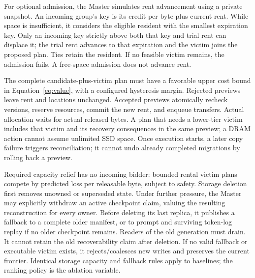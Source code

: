 For optional admission, the Master simulates rent advancement using a
private snapshot. An incoming group's key is its credit per byte plus
current rent. While space is insufficient, it considers the eligible
resident with the smallest expiration key. Only an incoming key strictly
above both that key and trial rent can displace it; the trial rent advances
to that expiration and the victim joins the proposed plan. Ties retain the
resident. If no feasible victim remains, the admission fails. A free-space
admission does not advance rent.

The complete candidate-plus-victim plan must have a favorable upper cost
bound in Equation~\ref{eq:value}, with a configured hysteresis margin.
Rejected previews leave rent and locations unchanged. Accepted previews
atomically recheck versions, reserve resources, commit the new rent, and
enqueue transfers. Actual allocation waits for actual released bytes. A plan that needs a
lower-tier victim includes that victim and its recovery consequences in
the same preview; a DRAM action cannot assume unlimited SSD space.
Once execution starts, a later copy failure triggers reconciliation;
it cannot undo already completed migrations by rolling back a preview.

Required capacity relief has no incoming bidder: bounded rental victim
plans compete by predicted loss per releasable byte, subject to safety.
Storage deletion first removes unowned or superseded state. Under further
pressure, the Master may explicitly withdraw an active checkpoint claim,
valuing the resulting reconstruction for every owner. Before deleting its
last replica, it publishes a fallback to a complete older manifest, or to
prompt and surviving token-log replay if no older checkpoint remains.
Readers of the old generation must drain. It cannot retain the old
recoverability claim after deletion. If no valid fallback or executable
victim exists, it rejects/coalesces new writes and preserves the current
frontier. Identical storage capacity and fallback rules apply to baselines;
the ranking policy is the ablation variable.

